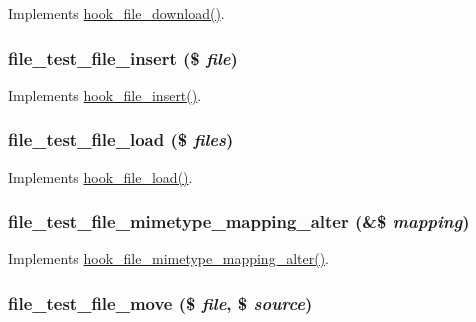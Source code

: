 \label{file__test_8module_a4692e5cdf927263bb8957f7f23218114}
Implements \hyperlink{group__hooks_gab73f0e658d6630220ba7836ccd011ecc}{hook\_\-file\_\-download()}. \hypertarget{file__test_8module_a59a51b53083d4fd3a629c35e18cea73b}{
\subsubsection[{file\_\-test\_\-file\_\-insert}]{\setlength{\rightskip}{0pt plus 5cm}file\_\-test\_\-file\_\-insert (\$ {\em file})}}
\label{file__test_8module_a59a51b53083d4fd3a629c35e18cea73b}
Implements \hyperlink{group__hooks_gac40fa27583fc4cba927f486098eaa79b}{hook\_\-file\_\-insert()}. \hypertarget{file__test_8module_a31927dacc1e6dd41f9e0bceba1beffe8}{
\subsubsection[{file\_\-test\_\-file\_\-load}]{\setlength{\rightskip}{0pt plus 5cm}file\_\-test\_\-file\_\-load (\$ {\em files})}}
\label{file__test_8module_a31927dacc1e6dd41f9e0bceba1beffe8}
Implements \hyperlink{group__hooks_ga9f6bf6919600b83a565421f6a7faf678}{hook\_\-file\_\-load()}. \hypertarget{file__test_8module_af6864b64bb65463d96cc4de823bdc694}{
\subsubsection[{file\_\-test\_\-file\_\-mimetype\_\-mapping\_\-alter}]{\setlength{\rightskip}{0pt plus 5cm}file\_\-test\_\-file\_\-mimetype\_\-mapping\_\-alter (\&\$ {\em mapping})}}
\label{file__test_8module_af6864b64bb65463d96cc4de823bdc694}
Implements \hyperlink{group__hooks_gaac5bb0122941c0b10df08d65ec358e99}{hook\_\-file\_\-mimetype\_\-mapping\_\-alter()}. \hypertarget{file__test_8module_ada5a3deac30182fc0536a3834347be02}{
\subsubsection[{file\_\-test\_\-file\_\-move}]{\setlength{\rightskip}{0pt plus 5cm}file\_\-test\_\-file\_\-move (\$ {\em file}, \/  \$ {\em source})}}
